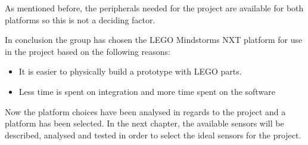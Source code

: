 As mentioned before, the peripherals needed for the project are available for
both platforms so this is not a deciding factor.\nl

In conclusion the group has chosen the LEGO Mindstorms NXT platform for use in
the project based on the following reasons:

\begin{itemize}
  \item It is easier to physically build a prototype with LEGO parts.
  \item Less time is spent on integration and more time spent on the software
\end{itemize}

Now the platform choices have been analysed in regards to the project and a
platform has been selected. In the next chapter, the available sensors will be
described, analysed and tested in order to select the ideal sensors for the
project.
